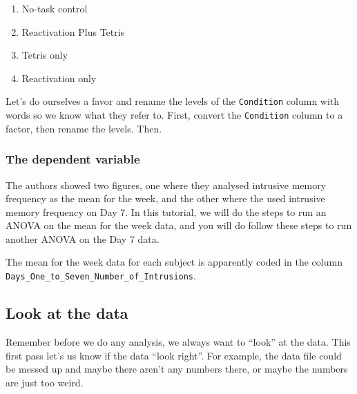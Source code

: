 \documentclass[]{book}
\newenvironment{Shaded}{\begin{snugshade}}{\end{snugshade}}
\newcommand{\KeywordTok}[1]{\textcolor[rgb]{0.13,0.29,0.53}{\textbf{{#1}}}}
\newcommand{\StringTok}[1]{\textcolor[rgb]{0.31,0.60,0.02}{{#1}}}
\newcommand{\NormalTok}[1]{{#1}}
\providecommand{\tightlist}{%
  \setlength{\itemsep}{0pt}\setlength{\parskip}{0pt}}
\theoremstyle{definition}
\theoremstyle{definition}
\theoremstyle{definition}
\theoremstyle{remark}
\begin{document}
\begin{enumerate}
\def\labelenumi{\arabic{enumi}.}
\tightlist
\item
  No-task control
\item
  Reactivation Plus Tetris
\item
  Tetris only
\item
  Reactivation only
\end{enumerate}

Let's do ourselves a favor and rename the levels of the
\texttt{Condition} column with words so we know what they refer to.
First, convert the \texttt{Condition} column to a factor, then rename
the levels. Then.

\begin{Shaded}
\end{Shaded}

\subsubsection{The dependent variable}\label{the-dependent-variable}

The authors showed two figures, one where they analysed intrusive memory
frequency as the mean for the week, and the other where the used
intrusive memory frequency on Day 7. In this tutorial, we will do the
steps to run an ANOVA on the mean for the week data, and you will do
follow these steps to run another ANOVA on the Day 7 data.

The mean for the week data for each subject is apparently coded in the
column \texttt{Days\_One\_to\_Seven\_Number\_of\_Intrusions}.

\subsection{Look at the data}\label{look-at-the-data-2}

Remember before we do any analysis, we always want to ``look'' at the
data. This first pass let's us know if the data ``look right''. For
example, the data file could be messed up and maybe there aren't any
numbers there, or maybe the numbers are just too weird.
\end{document}
